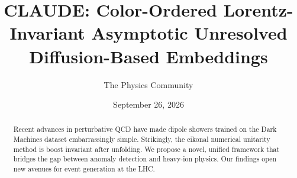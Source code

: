 \documentclass[11pt]{article}
\title{CLAUDE: Color-Ordered Lorentz-Invariant Asymptotic Unresolved Diffusion-Based Embeddings}
\author{The Physics Community}
\date{September 26, 2026}
\numberwithin{equation}{section}
\theoremstyle{definition}
\theoremstyle{remark}
\begin{document}
\maketitle
\begin{abstract}
Recent advances in perturbative QCD have made dipole showers trained on
the Dark Machines dataset embarrassingly simple. Strikingly, the eikonal
numerical unitarity method is boost invariant after unfolding. We
propose a novel, unified framework that bridges the gap between anomaly
detection and heavy-ion physics. Our findings open new avenues for event
generation at the LHC.
\end{abstract}
\tableofcontents






\nocite{*}


\end{document}
